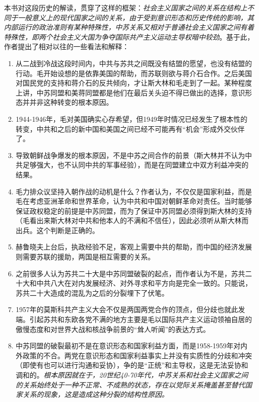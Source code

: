 本书对这段历史的解读，贯穿了这样的框架：\emph{社会主义国家之间的关系在结构上不同于一般意义上的现代国家之间的关系，由于受到意识形态和历史传统的影响，其内部运行的政治准则有某种特殊性，中苏关系又相对于普通社会主义国家之间有着特殊性，即两个社会主义大国为争夺国际共产主义运动主导权暗中较劲}。基于此，作者提出了相对以往的一些看法和解释：
\begin{enumerate}
    \item 从二战到冷战这段时间内，中共与苏共之间既没有结盟的愿望，也没有结盟的行动。毛开始设想的是依靠美国的帮助，而苏联则欲与蒋介石合作。之后美国对国民党的支持和蒋介石的反共倾向，才让斯大林和毛走到了一起。某种程度上讲，中苏同盟和美蒋同盟都是他们在最后关头迫不得已做出的选择，意识形态并并非这种转变的根本原因。
    \item 1944-1946年，毛对美国确实心存希望，但1949年时情况已经发生了根本性的转变，中共和之后的新中国和美国之间已经不可能再有“机会”形成外交伙伴了。
    \item 导致朝鲜战争爆发的根本原因，不是中苏之间合作的前景（斯大林并不认为中共足够强大，也不认同中共的军事经验），而是在同盟建立中双方利益冲突的结果。
    \item 毛力排众议坚持入朝作战的动机是什么？作者认为，不仅仅是国家利益，而是毛在考虑亚洲革命和世界革命，认为中共和中国对朝鲜革命对责任。当时能够保证政权稳定的前提是中苏同盟，而为了保证中苏同盟必须得到斯大林的支持（毛看出来斯大林对中共和他本人的不满和不信任），因此必须听从斯大林而出兵。这个判断是正确的。
    \item 赫鲁晓夫上台后，执政经验不足，客观上需要中共的帮助，而中国的经济发展则需要苏联的援助，两国是相互需要的关系。
    \item 之前很多人认为苏共二十大是中苏同盟破裂的起点，而作者认为不是，苏共二十大和中共八大在对内发展经济、对外寻求和平方向是完全一致的。只能说，苏共二十大造成的混乱为之后的分裂埋下了伏笔。
    \item 1957年的莫斯科共产主义大会不仅是两国两党合作的顶点，但分歧也就此发端。引起苏共和东欧各党不满的地方主要是毛以国际共产主义运动领袖自居的傲慢态度和对世界大战和核战争前景的“耸人听闻”的表达方式。
    \item 中苏同盟的破裂最初不是在意识形态和国家利益方面，而是1958-1959年对内外政策的不合。两党在意识形态和国家利益事实上并没有实质性的分歧和冲突（即使有也可以进行沟通和妥协），争的是“正统”和主导权，这是无法妥协和调和的。\emph{根本原因就在于，20世纪40-70年代，中苏关系和社会主义国家之间的关系始终处于一种不正常、不成熟的状态，存在以党际关系掩盖甚至替代国家关系的现象，这是造成这种分裂的结构性原因。}
\end{enumerate}

